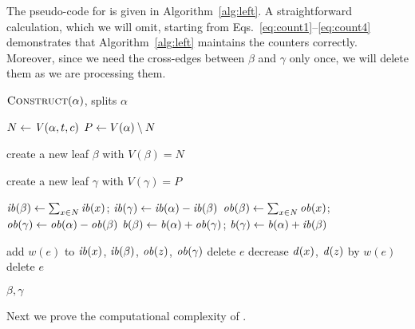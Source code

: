 The pseudo-code for \algleft is given in Algorithm~\ref{alg:left}.
A straightforward calculation, which we will omit, starting from Eqs.~\ref{eq:count1}--\ref{eq:count4}
demonstrates that Algorithm~\ref{alg:left} maintains the counters correctly.
Moreover, since we need the cross-edges between $\beta$ and $\gamma$ only
once, we will delete them as we are processing them.




\begin{algorithm}[ht!]
\caption{$\textsc{Construct}(\alpha)$, splits $\alpha$}
\label{alg:left}
	$N \define \labeldic{\alpha, t, c}$\;
	$P \leftarrow V(\alpha) \setminus N$\;
	
	create a new leaf $\beta$ with  $V(\beta) = N$\; 

	create a new leaf $\gamma$ with  $V(\gamma) = P$\;

	 {

		$\inback{\beta} \define \sum_{x \in N} \inback{x}$;
		$\inback{\gamma} \define \inback{\alpha} - \inback{\beta}$\;
		$\outback{\beta} \define \sum_{x \in N} \outback{x}$;
		$\outback{\gamma} \define \outback{\alpha} - \outback{\beta}$\;
		$\back{\beta} \define \back{\alpha} + \outback{\gamma}$;
		$\back{\gamma} \define \back{\alpha} + \inback{\beta}$\;

		 {
			 {
				add $w(e)$ to $\inback{x}$, $\inback{\beta}$, $\outback{z}$, $\outback{\gamma}$\;
				delete $e$\;
			}
			 {
				decrease $\diff{x}$, $\diff{z}$ by $w(e)$\;
				delete $e$\;
			}
		}
	}
    \Return $\beta,\gamma$ \;
\end{algorithm}


Next we prove the computational complexity of \algpartition.



